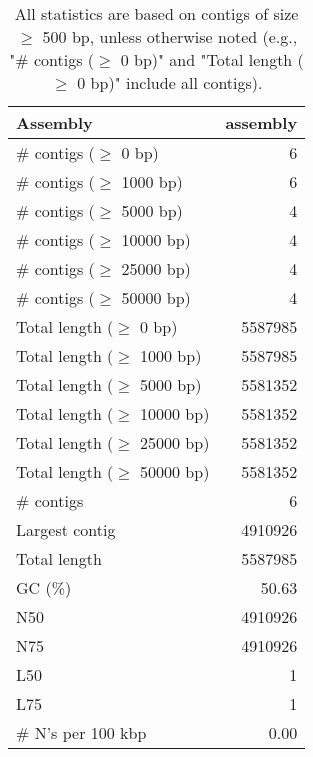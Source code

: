\documentclass[12pt,a4paper]{article}
\begin{document}
\begin{table}[ht]
\begin{center}
\caption{All statistics are based on contigs of size $\geq$ 500 bp, unless otherwise noted (e.g., "\# contigs ($\geq$ 0 bp)" and "Total length ($\geq$ 0 bp)" include all contigs).}
\begin{tabular}{|l*{1}{|r}|}
\hline
Assembly & assembly \\ \hline
\# contigs ($\geq$ 0 bp) & 6 \\ \hline
\# contigs ($\geq$ 1000 bp) & 6 \\ \hline
\# contigs ($\geq$ 5000 bp) & 4 \\ \hline
\# contigs ($\geq$ 10000 bp) & 4 \\ \hline
\# contigs ($\geq$ 25000 bp) & 4 \\ \hline
\# contigs ($\geq$ 50000 bp) & 4 \\ \hline
Total length ($\geq$ 0 bp) & 5587985 \\ \hline
Total length ($\geq$ 1000 bp) & 5587985 \\ \hline
Total length ($\geq$ 5000 bp) & 5581352 \\ \hline
Total length ($\geq$ 10000 bp) & 5581352 \\ \hline
Total length ($\geq$ 25000 bp) & 5581352 \\ \hline
Total length ($\geq$ 50000 bp) & 5581352 \\ \hline
\# contigs & 6 \\ \hline
Largest contig & 4910926 \\ \hline
Total length & 5587985 \\ \hline
GC (\%) & 50.63 \\ \hline
N50 & 4910926 \\ \hline
N75 & 4910926 \\ \hline
L50 & 1 \\ \hline
L75 & 1 \\ \hline
\# N's per 100 kbp & 0.00 \\ \hline
\end{tabular}
\end{center}
\end{table}
\end{document}
